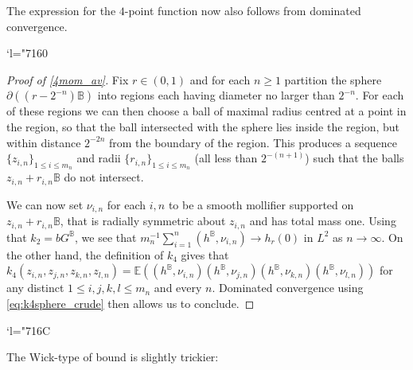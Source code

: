 \documentclass[10pt]{amsart}
\newcommand{\Changel}{\mathcode`l="7160}
\newcommand{\Changelback}{\mathcode`l="716C}
\theoremstyle{definition}
\newcommand{\E}{\mathbb{E}}
\newcommand{\B}{\mathbb{B}}\let\D\B\let\Ub\B
\begin{document}
The expression for the $4$-point function now also follows from dominated convergence.

\Changel
\begin{proof}[Proof of \eqref{4mom_av}]
Fix $r\in (0,1)$ and for each $n\ge 1$ partition the sphere $\partial((r-2^{-n})\B)$ into regions each having diameter no larger than $2^{-n}$. For each of these regions we can then choose a ball of maximal radius centred at a point in the region, so that the ball intersected with the sphere lies inside the region, but within distance $2^{-2n}$ from the boundary of the region. This produces a sequence $\{z_{i,n}\}_{1\le i\le m_n}$ and radii $
\{r_{i,n}\}_{1\le i \le m_n}$ (all less than $2^{-(n+1)}$) such that the balls $z_{i,n}+r_{i,n}\B$ do not intersect.

We can now set $\nu_{i,n}$ for each $i,n$ to be a smooth mollifier supported on $z_{i,n}+r_{i,n}\B$, that is radially symmetric about $z_{i,n}$ and has total mass one. Using that $k_2=bG^\B$, we see that $m_n^{-1}\sum_{i=1}^n (h^\B,\nu_{i,n})\to h_r(0)$ in $L^2$ as $n\to \infty$. On the other hand, the definition of $k_4$ gives that $k_4(z_{i,n},z_{j,n},z_{k,n},z_{l,n})=\E((h^\B,\nu_{i,n})(h^\B,\nu_{j,n})(h^\B,\nu_{k,n})(h^\B,\nu_{l,n}))$ for any distinct $1\le i,j,k,l\le m_n$ and every $n$. Dominated convergence using \eqref{eq:k4sphere_crude} then allows us to conclude.
\end{proof}
\Changelback

The Wick-type of bound is slightly trickier:
\end{document}
